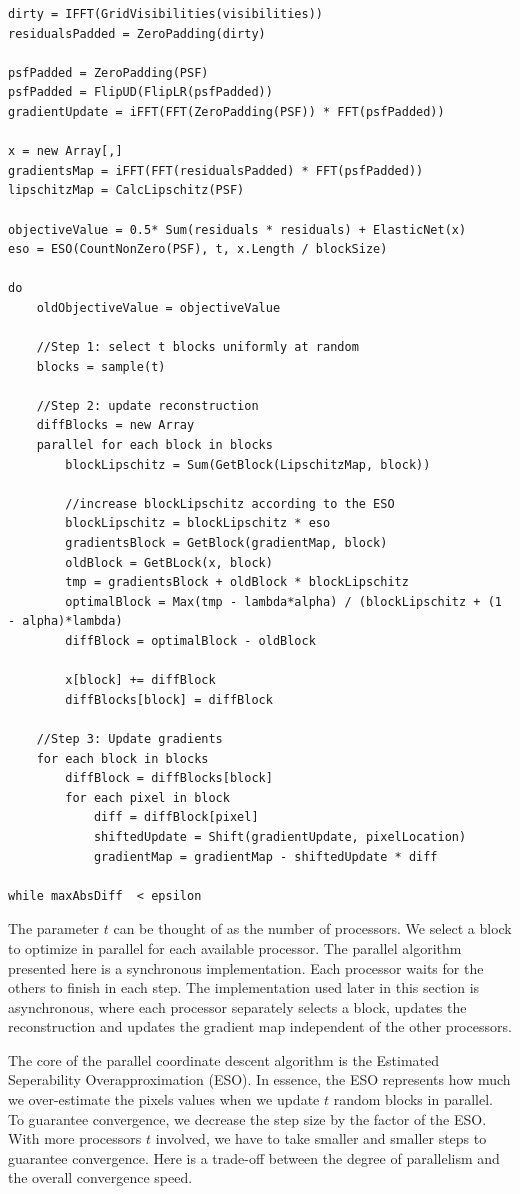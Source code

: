 \begin{lstlisting}
dirty = IFFT(GridVisibilities(visibilities))
residualsPadded = ZeroPadding(dirty)

psfPadded = ZeroPadding(PSF)
psfPadded = FlipUD(FlipLR(psfPadded))
gradientUpdate = iFFT(FFT(ZeroPadding(PSF)) * FFT(psfPadded))

x = new Array[,]
gradientsMap = iFFT(FFT(residualsPadded) * FFT(psfPadded))
lipschitzMap = CalcLipschitz(PSF)

objectiveValue = 0.5* Sum(residuals * residuals) + ElasticNet(x)
eso = ESO(CountNonZero(PSF), t, x.Length / blockSize)

do 
	oldObjectiveValue = objectiveValue
	
	//Step 1: select t blocks uniformly at random
	blocks = sample(t)
	
	//Step 2: update reconstruction
	diffBlocks = new Array
	parallel for each block in blocks
		blockLipschitz = Sum(GetBlock(LipschitzMap, block))
		
		//increase blockLipschitz according to the ESO
		blockLipschitz = blockLipschitz * eso
		gradientsBlock = GetBlock(gradientMap, block)
		oldBlock = GetBLock(x, block)
		tmp = gradientsBlock + oldBlock * blockLipschitz
		optimalBlock = Max(tmp - lambda*alpha) / (blockLipschitz + (1 - alpha)*lambda)
		diffBlock = optimalBlock - oldBlock
		
		x[block] += diffBlock
		diffBlocks[block] = diffBlock
	
	//Step 3: Update gradients
	for each block in blocks
		diffBlock = diffBlocks[block]
		for each pixel in block
			diff = diffBlock[pixel]
			shiftedUpdate = Shift(gradientUpdate, pixelLocation)
			gradientMap = gradientMap - shiftedUpdate * diff
			
while maxAbsDiff  < epsilon
\end{lstlisting}

The parameter $t$ can be thought of as the number of processors. We select a block to optimize in parallel for each available processor. The parallel algorithm presented here is a synchronous implementation. Each processor waits for the others to finish in each step. The implementation used later in this section is asynchronous, where each processor separately selects a block, updates the reconstruction and updates the gradient map independent of the other processors. 

The core of the parallel coordinate descent algorithm is the Estimated Seperability Overapproximation (ESO). In essence, the ESO represents how much we over-estimate the pixels values when we update $t$ random blocks in parallel. To guarantee convergence, we decrease the step size by the factor of the ESO. With more processors $t$ involved, we have to take smaller and smaller steps to guarantee convergence. Here is a trade-off between the degree of parallelism and the overall convergence speed.

